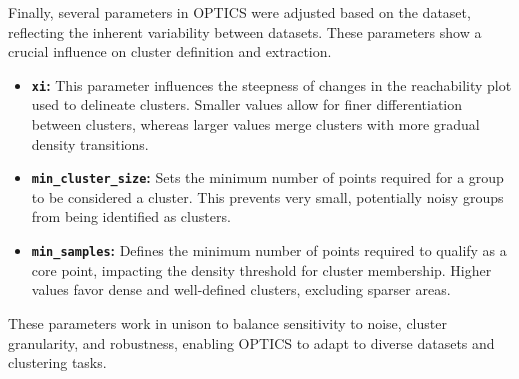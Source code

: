 Finally, several parameters in OPTICS were adjusted based on the dataset, reflecting the inherent variability between
datasets. These parameters show a crucial influence on cluster definition and extraction.
\begin{itemize}
    \item \textbf{\texttt{xi}:} This parameter influences the steepness of changes in the reachability plot used to
    delineate clusters. Smaller values allow for finer differentiation between clusters, whereas larger values merge
     clusters with more gradual density transitions.
    \item \textbf{\texttt{min\_cluster\_size}:} Sets the minimum number of points required for a group to be considered
     a cluster. This prevents very small, potentially noisy groups from being identified as clusters.
    \item \textbf{\texttt{min\_samples}:} Defines the minimum number of points required to qualify as a core point,
    impacting the density threshold for cluster membership. Higher values favor dense and well-defined clusters,
    excluding sparser areas.
\end{itemize}

These parameters work in unison to balance sensitivity to noise, cluster granularity, and robustness, enabling OPTICS
to adapt to diverse datasets and clustering tasks.

